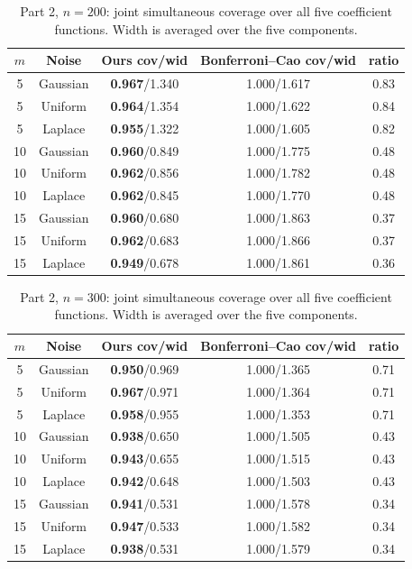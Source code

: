 \documentclass[12pt]{article} %
\theoremstyle{definition}
\begin{document}
\begin{table}[t!]
\caption{Part 2, \(n=200\): joint simultaneous coverage over all five
coefficient functions. Width is averaged over the five components.}
\label{tab:part2-200}\par
\begin{center}
\begin{tabular}{|ccccc|}
\hline
\(m\) & Noise & {\bf Ours cov/wid} & Bonferroni--Cao cov/wid & ratio \\
\hline
5  & Gaussian & {\bf 0.967}/1.340 & 1.000/1.617 & 0.83 \\
5  & Uniform  & {\bf 0.964}/1.354 & 1.000/1.622 & 0.84 \\
5  & Laplace  & {\bf 0.955}/1.322 & 1.000/1.605 & 0.82 \\
10 & Gaussian & {\bf 0.960}/0.849 & 1.000/1.775 & 0.48 \\
10 & Uniform  & {\bf 0.962}/0.856 & 1.000/1.782 & 0.48 \\
10 & Laplace  & {\bf 0.962}/0.845 & 1.000/1.770 & 0.48 \\
15 & Gaussian & {\bf 0.960}/0.680 & 1.000/1.863 & 0.37 \\
15 & Uniform  & {\bf 0.962}/0.683 & 1.000/1.866 & 0.37 \\
15 & Laplace  & {\bf 0.949}/0.678 & 1.000/1.861 & 0.36 \\
\hline
\end{tabular}
\end{center}
\end{table}

\begin{table}[t!]
\caption{Part 2, \(n=300\): joint simultaneous coverage over all five
coefficient functions. Width is averaged over the five components.}
\label{tab:part2-300}\par
\begin{center}
\begin{tabular}{|ccccc|}
\hline
\(m\) & Noise & {\bf Ours cov/wid} & Bonferroni--Cao cov/wid & ratio \\
\hline
5  & Gaussian & {\bf 0.950}/0.969 & 1.000/1.365 & 0.71 \\
5  & Uniform  & {\bf 0.967}/0.971 & 1.000/1.364 & 0.71 \\
5  & Laplace  & {\bf 0.958}/0.955 & 1.000/1.353 & 0.71 \\
10 & Gaussian & {\bf 0.938}/0.650 & 1.000/1.505 & 0.43 \\
10 & Uniform  & {\bf 0.943}/0.655 & 1.000/1.515 & 0.43 \\
10 & Laplace  & {\bf 0.942}/0.648 & 1.000/1.503 & 0.43 \\
15 & Gaussian & {\bf 0.941}/0.531 & 1.000/1.578 & 0.34 \\
15 & Uniform  & {\bf 0.947}/0.533 & 1.000/1.582 & 0.34 \\
15 & Laplace  & {\bf 0.938}/0.531 & 1.000/1.579 & 0.34 \\
\hline
\end{tabular}
\end{center}
\end{table}
\end{document}
